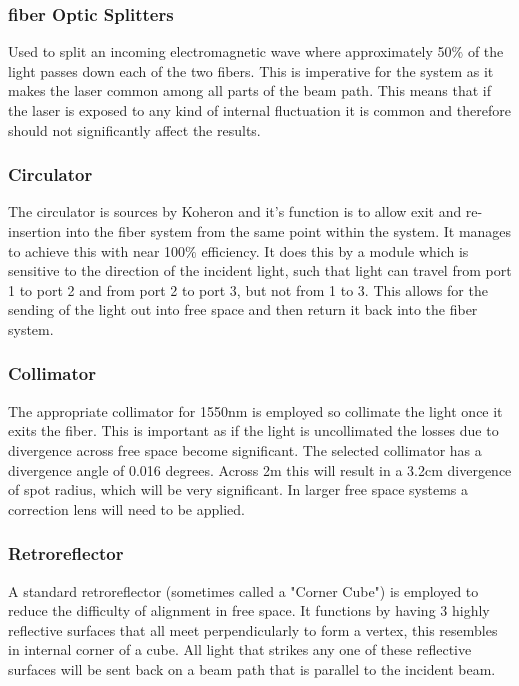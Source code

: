 \documentclass[12pt,a4paper,oneside]{report}
\begin{document}
\subsubsection{fiber Optic Splitters}
Used to split an incoming electromagnetic wave \cite{1x2Koheron} where approximately 50$\%$ of the light passes down each of the two fibers. This is imperative for the system as it makes the laser common among all parts of the beam path. This means that if the laser is exposed to any kind of internal fluctuation it is common and therefore should not significantly affect the results.

\subsubsection{Circulator}
The circulator \cite{FiberKoheron} is sources by Koheron and it's function is to allow exit and re-insertion into the fiber system from the same point within the system. It manages to achieve this with near 100$\%$ efficiency. It does this by a module which is sensitive to the direction of the incident light, such that light can travel from port 1 to port 2 and from port 2 to port 3, but not from 1 to 3. This allows for the sending of the light out into free space and then return it back into the fiber system.

\subsubsection{Collimator}
The appropriate collimator \cite{Air-SpacedSMA} for 1550nm is employed so collimate the light once it exits the fiber. This is important as if the light is uncollimated the losses due to divergence across free space become significant. The selected collimator has a divergence angle of 0.016 degrees. Across 2m this will result in a 3.2cm divergence of spot radius, which will be very significant. In larger free space systems a correction lens will need to be applied.

\subsubsection{Retroreflector}
A standard retroreflector (sometimes called a "Corner Cube") is employed to reduce the difficulty of alignment in free space. It functions by having 3 highly reflective surfaces that all meet perpendicularly to form a vertex, this resembles in internal corner of a cube. All light that strikes any one of these reflective surfaces will be sent back on a beam path that is parallel to the incident beam.
\end{document}
